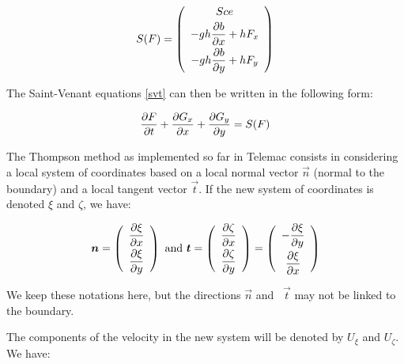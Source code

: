 \begin{equation*}
S(F)=\left( 
\begin{array}{c}
Sce \smallskip\\ 
-gh\dfrac{\partial b}{\partial x}+hF_{x} \smallskip\\ 
-gh\dfrac{\partial b}{\partial y}+hF_{y}%
\end{array}
\right)
\end{equation*}

The Saint-Venant equations \eqref{svt} can then be written in the following form:

\begin{equation*}
\dfrac{\partial F}{\partial t}+\dfrac{\partial G_{x}}{\partial x}+\dfrac{%
\partial G_{y}}{\partial y}=S(F)
\end{equation*}

The Thompson method as implemented so far in Telemac consists in considering
a local system of coordinates based on a local normal vector $%
\vec{n}$ (normal to the boundary) and a local tangent vector $%
\vec{t}$. If the new system of coordinates is denoted $\xi $ and 
$\zeta $, we have:

\begin{equation*}
\vec{n}=\left( 
\begin{array}{c}
\dfrac{\partial \xi }{\partial x} \smallskip\\ 
\dfrac{\partial \xi }{\partial y}%
\end{array}
\right) ~\text{and~}\vec{t}=\left( 
\begin{array}{c}
\dfrac{\partial \zeta }{\partial x} \smallskip\\ 
\dfrac{\partial \zeta }{\partial y}%
\end{array}
\right) =\left( 
\begin{array}{c}
-\dfrac{\partial \xi }{\partial y} \smallskip\\ 
\dfrac{\partial \xi }{\partial x}%
\end{array}
\right)
\end{equation*}

We keep these notations here, but the directions $\vec{n}$ and ~$%
\vec{t}$ may not be linked to the boundary.

The components of the velocity in the new system will be denoted by $U_{\xi }$ and 
$U_{\zeta }$. We have:

